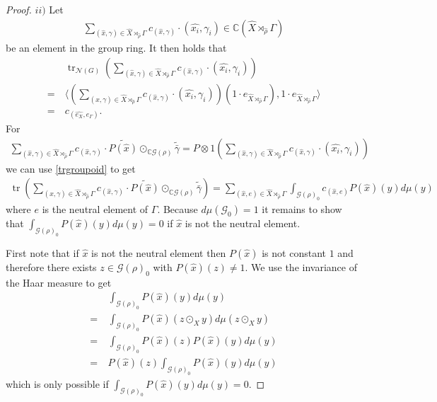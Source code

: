 \documentclass[12pt,a4paper]{scrartcl}
\theoremstyle{plain}
\theoremstyle{definition}
\numberwithin{equation}{section}
\newcommand{\C}{\mathbb{C}} %
\newcommand{\2}{\mathbb{Z} / 2 \mathbb{Z}}
\newcommand{\G}{\mathcal{G}}
\newcommand{\1}{\bar{1}}
\newcommand{\0}{\bar{0}}
\newcommand{\tr}{\operatorname{tr}}
\begin{document}
\begin{proof}
	$ii)$ Let 
	\begin{align*}
		\sum_{(\hat{x}, \gamma) \in \hat{X} \rtimes_{\hat{\rho}} \Gamma} c_{(\hat{x}, \gamma)} \cdot (\hat{x_i}, \gamma_i) \in \C(\hat{X} \rtimes_{\hat{\rho}} \Gamma)
	\end{align*}
	be an element in the group ring. It then holds that
	\begin{align*}
		 &~ \tr_{\mathcal{N}(G)}(\sum_{(\hat{x}, \gamma) \in \hat{X} \rtimes_{\hat{\rho}} \Gamma} c_{(\hat{x}, \gamma)} \cdot (\hat{x_i}, \gamma_i)) \\
		=&~ \langle (\sum_{(\hat{x}, \gamma) \in \hat{X} \rtimes_{\hat{\rho}} \Gamma} c_{(\hat{x}, \gamma)} \cdot (\hat{x_i}, \gamma_i))(1 \cdot e_{\hat{X} \rtimes_{\hat{\rho}} \Gamma}), 1 \cdot e_{\hat{X} \rtimes_{\hat{\rho}} \Gamma} \rangle \\
		=&~ c_{(\hat{e_X}, e_\Gamma)}.
	\end{align*}
	For 
	\begin{align*}
		\sum_{(\hat{x}, \gamma) \in \hat{X} \rtimes_{\hat{\rho}} \Gamma} c_{(\hat{x}, \gamma)} \cdot \widetilde{P(\hat{x})} \odot_{\C\G(\rho)} \widetilde{\bar{\gamma}} = P \otimes 1 (\sum_{(\hat{x}, \gamma) \in \hat{X} \rtimes_{\hat{\rho}} \Gamma} c_{(\hat{x}, \gamma)} \cdot (\hat{x_i}, \gamma_i))
	\end{align*}
	we can use \ref{trgroupoid} to get
	\begin{align*}
		\tr(\sum_{(\hat{x}, \gamma) \in \hat{X} \rtimes_{\hat{\rho}} \Gamma} c_{(\hat{x}, \gamma)} \cdot \widetilde{P(\hat{x})} \odot_{\C\G(\rho)} \widetilde{\bar{\gamma}}) = \sum_{(\hat{x}, e) \in \hat{X} \rtimes_{\hat{\rho}} \Gamma} \int_{\mathcal{G(\rho)}_0} c_{(\hat{x}, e)} P(\hat{x})(y) d\mu(y)
	\end{align*}
	where $e$ is the neutral element of $\Gamma$. Because $d \mu(\G_0) = 1$ it remains to show that $\int_{\G(\rho)_0} P(\hat{x})(y) d\mu(y) = 0$ if $\hat{x}$ is not the neutral element.
	
	First note that if $\hat{x}$ is not the neutral element then $P(\hat{x})$ is not constant $1$ and therefore there exists $z \in \G(\rho)_0$ with $P(\hat{x})(z) \neq 1$. We use the invariance of the Haar measure to get
	\begin{align*}
		 &~ \int_{\G(\rho)_0} P(\hat{x})(y) d\mu(y) \\
		=&~ \int_{\G(\rho)_0} P(\hat{x})(z \odot_{X} y) d\mu(z \odot_{X} y) \\
		=&~ \int_{\G(\rho)_0} P(\hat{x})(z) P(\hat{x})(y) d\mu(y) \\
		=&~ P(\hat{x})(z) \int_{\G(\rho)_0} P(\hat{x})(y) d\mu(y)
	\end{align*}
	which is only possible if $\int_{\G(\rho)_0} P(\hat{x})(y) d\mu(y) = 0$.
	

\end{proof}
\end{document}

